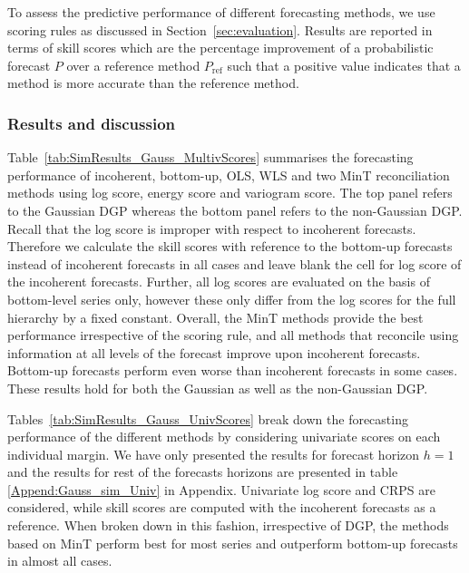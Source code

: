\documentclass[12pt]{article}
\theoremstyle{definition}
\begin{document}
To assess the predictive performance of different forecasting methods, we use scoring rules as discussed in Section~\ref{sec:evaluation}. Results are reported in terms of skill scores which are the percentage improvement of a probabilistic forecast $P$ over a reference method $P_{\mbox{ref}}$ such that a positive value indicates that a method is more accurate than the reference method. 

\subsubsection{Results and discussion}

Table~\ref{tab:SimResults_Gauss_MultivScores} summarises the forecasting performance of incoherent, bottom-up, OLS, WLS and two MinT reconciliation methods using log score, energy score and variogram score. The top panel refers to the Gaussian DGP whereas the bottom panel refers to the non-Gaussian DGP. Recall that the log score is improper with respect to incoherent forecasts. Therefore we calculate the skill scores with reference to the bottom-up forecasts instead of incoherent forecasts in all cases and leave blank the cell for log score of the incoherent forecasts. Further, all log scores are evaluated on the basis of bottom-level series only, however these only differ from the log scores for the full hierarchy by a fixed constant. Overall, the MinT methods provide the best performance irrespective of the scoring rule, and all methods that reconcile using information at all levels of the forecast improve upon incoherent forecasts. Bottom-up forecasts perform even worse than incoherent forecasts in some cases. These results hold for both the Gaussian as well as the non-Gaussian DGP.

Tables~\ref{tab:SimResults_Gauss_UnivScores} break down the forecasting performance of the different methods by considering univariate scores on each individual margin. We have only presented the results for forecast horizon $h=1$ and the results for rest of the forecasts horizons are presented in table \ref{Append:Gauss_sim_Univ} in Appendix.  Univariate log score and CRPS are considered, while skill scores are computed with the incoherent forecasts as a reference. When broken down in this fashion, irrespective of DGP, the methods based on MinT perform best for most series and outperform bottom-up forecasts in almost all cases. 
\end{document}
